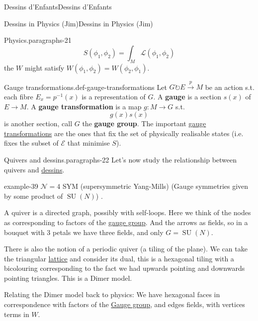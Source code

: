 \documentclass[10pt,]{book}
\newcommand{\terminology}[1]{\textbf{#1}}
\numberwithin{equation}{section}
\newcommand{\inv}{^{-1}}
\newcommand{\acts}{\circlearrowright}
\DeclareMathOperator{\specialunitary}{SU}
\begin{document}
\begin{chapterptx}{Dessins d'Enfants}{}{Dessins d'Enfants}{}{}
\begin{sectionptx}{Dessins in Physics (Jim)}{}{Dessins in Physics (Jim)}{}{}
\begin{paragraphs}{Physics.}{paragraphs-21}
\begin{equation*}
S(\phi_1, \phi_2) = \int_M \mathcal L(\phi_1,\phi_2)
\end{equation*}
the \(W\) might satisfy \(W(\phi_1, \phi_2) = W(\phi_2, \phi_1)\).%
\begin{definition}{Gauge transformations.}{def-gauge-transformations}%
\hypertarget{p-771}{}%
Let \(G \acts E \xrightarrow p M\) be an action s.t. each fibre \(E_x = p \inv(x)\) is a representation of \(G\). A \terminology{gauge} is a section \(s(x)\) of \(E \to M\). A \terminology{gauge transformation} is a map \(g\colon M \to G\) s.t.%
\begin{equation*}
g(x) s(x)
\end{equation*}
is another section, call \(G\) the \terminology{gauge group}. The important \hyperref[def-gauge-transformations]{gauge transformations} are the ones that fix the set of physically realisable states (i.e. fixes the subset of \(\mathcal E\) that minimise \(S\)).%
\end{definition}
\end{paragraphs}%
\begin{paragraphs}{Quivers and dessins.}{paragraphs-22}%
\hypertarget{p-772}{}%
Let's now study the relationship between quivers and \hyperref[def-dessin-denfant]{dessins}.%
\begin{example}{}{example-39}%
\hypertarget{p-773}{}%
\(\mathcal N = 4\) SYM (supersymmetric Yang-Mills) (Gauge symmetries given by some product of \(\specialunitary (N)\)) .%
\end{example}
\hypertarget{p-774}{}%
A quiver is a directed graph, possibly with self-loops. Here we think of the nodes as corresponding to factors of the \hyperref[def-gauge-transformations]{gauge group}. And the arrows as fields, so in a bouquet with 3 petals we have three fields, and only \(G = \specialunitary (N)\).%
\par
\hypertarget{p-775}{}%
There is also the notion of a periodic quiver (a tiling of the plane). We can take the triangular \hyperref[def-buntes-lattice]{lattice} and consider its dual, this is a hexagonal tiling with a bicolouring corresponding to the fact we had upwards pointing and downwards pointing triangles. This is a Dimer model.%
\par
\hypertarget{p-776}{}%
Relating the Dimer model back to physics: We have hexagonal faces in correspondence with factors of the \hyperref[def-gauge-transformations]{Gauge group}, and edges fields, with vertices terms in \(W\).%
\par
\hypertarget{p-777}{}%

\end{paragraphs}
\end{sectionptx}
\end{chapterptx}
\end{document}
